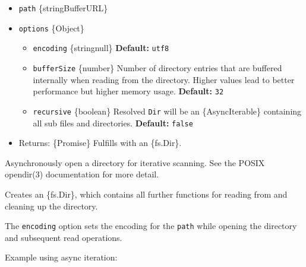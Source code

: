 \begin{itemize}
\tightlist
\item
  \texttt{path} \{string\textbar Buffer\textbar URL\}
\item
  \texttt{options} \{Object\}

  \begin{itemize}
  \tightlist
  \item
    \texttt{encoding} \{string\textbar null\} \textbf{Default:}
    \texttt{\textquotesingle{}utf8\textquotesingle{}}
  \item
    \texttt{bufferSize} \{number\} Number of directory entries that are
    buffered internally when reading from the directory. Higher values
    lead to better performance but higher memory usage.
    \textbf{Default:} \texttt{32}
  \item
    \texttt{recursive} \{boolean\} Resolved \texttt{Dir} will be an
    \{AsyncIterable\} containing all sub files and directories.
    \textbf{Default:} \texttt{false}
  \end{itemize}
\item
  Returns: \{Promise\} Fulfills with an \{fs.Dir\}.
\end{itemize}

Asynchronously open a directory for iterative scanning. See the POSIX
opendir(3) documentation for more detail.

Creates an \{fs.Dir\}, which contains all further functions for reading
from and cleaning up the directory.

The \texttt{encoding} option sets the encoding for the \texttt{path}
while opening the directory and subsequent read operations.

Example using async iteration:

\begin{Shaded}
\begin{Highlighting}[]
 \OperatorTok{;}

\NormalTok{ \{}
  \OperatorTok{=}  \NormalTok{(}\NormalTok{)}\OperatorTok{;}
   \NormalTok{ (}
    \NormalTok{)}\OperatorTok{;}
\NormalTok{\} }
  \OperatorTok{;}
\NormalTok{\}}
\end{Highlighting}
\end{Shaded}

